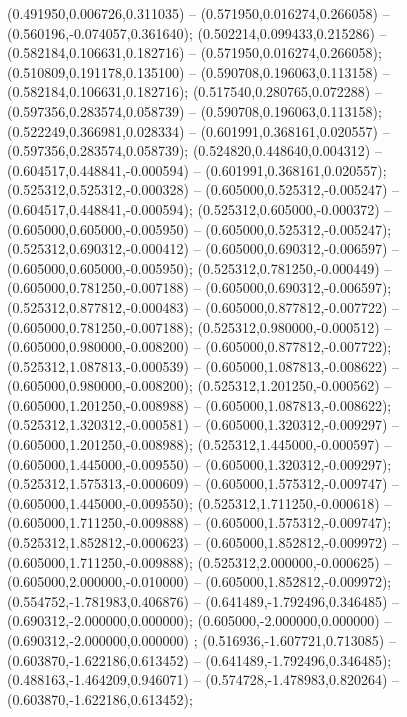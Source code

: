  (0.491950,0.006726,0.311035) -- (0.571950,0.016274,0.266058) -- (0.560196,-0.074057,0.361640);
 (0.502214,0.099433,0.215286) -- (0.582184,0.106631,0.182716) -- (0.571950,0.016274,0.266058);
 (0.510809,0.191178,0.135100) -- (0.590708,0.196063,0.113158) -- (0.582184,0.106631,0.182716);
 (0.517540,0.280765,0.072288) -- (0.597356,0.283574,0.058739) -- (0.590708,0.196063,0.113158);
 (0.522249,0.366981,0.028334) -- (0.601991,0.368161,0.020557) -- (0.597356,0.283574,0.058739);
 (0.524820,0.448640,0.004312) -- (0.604517,0.448841,-0.000594) -- (0.601991,0.368161,0.020557);
 (0.525312,0.525312,-0.000328) -- (0.605000,0.525312,-0.005247) -- (0.604517,0.448841,-0.000594);
 (0.525312,0.605000,-0.000372) -- (0.605000,0.605000,-0.005950) -- (0.605000,0.525312,-0.005247);
 (0.525312,0.690312,-0.000412) -- (0.605000,0.690312,-0.006597) -- (0.605000,0.605000,-0.005950);
 (0.525312,0.781250,-0.000449) -- (0.605000,0.781250,-0.007188) -- (0.605000,0.690312,-0.006597);
 (0.525312,0.877812,-0.000483) -- (0.605000,0.877812,-0.007722) -- (0.605000,0.781250,-0.007188);
 (0.525312,0.980000,-0.000512) -- (0.605000,0.980000,-0.008200) -- (0.605000,0.877812,-0.007722);
 (0.525312,1.087813,-0.000539) -- (0.605000,1.087813,-0.008622) -- (0.605000,0.980000,-0.008200);
 (0.525312,1.201250,-0.000562) -- (0.605000,1.201250,-0.008988) -- (0.605000,1.087813,-0.008622);
 (0.525312,1.320312,-0.000581) -- (0.605000,1.320312,-0.009297) -- (0.605000,1.201250,-0.008988);
 (0.525312,1.445000,-0.000597) -- (0.605000,1.445000,-0.009550) -- (0.605000,1.320312,-0.009297);
 (0.525312,1.575313,-0.000609) -- (0.605000,1.575312,-0.009747) -- (0.605000,1.445000,-0.009550);
 (0.525312,1.711250,-0.000618) -- (0.605000,1.711250,-0.009888) -- (0.605000,1.575312,-0.009747);
 (0.525312,1.852812,-0.000623) -- (0.605000,1.852812,-0.009972) -- (0.605000,1.711250,-0.009888);
 (0.525312,2.000000,-0.000625) -- (0.605000,2.000000,-0.010000) -- (0.605000,1.852812,-0.009972);
 (0.554752,-1.781983,0.406876) -- (0.641489,-1.792496,0.346485) -- (0.690312,-2.000000,0.000000);
 (0.605000,-2.000000,0.000000) -- (0.690312,-2.000000,0.000000) ;
 (0.516936,-1.607721,0.713085) -- (0.603870,-1.622186,0.613452) -- (0.641489,-1.792496,0.346485);
 (0.488163,-1.464209,0.946071) -- (0.574728,-1.478983,0.820264) -- (0.603870,-1.622186,0.613452);
